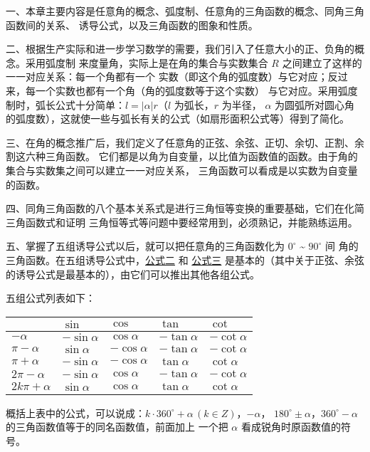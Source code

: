 \xiaojie

一、本章主要内容是任意角的概念、弧度制、任意角的三角函数的概念、同角三角函数间的关系、
诱导公式，以及三角函数的图象和性质。

二、根据生产实际和进一步学习数学的需要，我们引入了任意大小的正、负角的概念。采用弧度制
来度量角，实际上是在角的集合与实数集合 $R$ 之间建立了这样的一一对应关系：每一个角都有一个
实数（即这个角的弧度数）与它对应；反过来，每一个实数也都有一个角（角的弧度数等于这个实数）
与它对应。采用弧度制时，弧长公式十分简单：$l = |\alpha| r$（$l$ 为弧长，$r$ 为半径，
$\alpha$ 为圆弧所对圆心角的弧度数），这就使一些与弧长有关的公式（如扇形面积公式等）得到了简化。

三、在角的概念推广后，我们定义了任意角的正弦、余弦、正切、余切、正割、余割这六种三角函数。
它们都是以角为自变量，以比值为函数值的函数。由于角的集合与实数集之间可以建立一一对应关系，
三角函数可以看成是以实数为自变量的函数。

四、同角三角函数的八个基本关系式是进行三角恒等变换的重要基础，它们在化简三角函数式和证明
三角恒等式等问题中要经常用到，必须熟记，并能熟练运用。

五、掌握了五组诱导公式以后，就可以把任意角的三角函数化为 $0^\circ$ \~{} $90^\circ$ 间
角的三角函数。在五组诱导公式中，\hyperref[gongshi:2]{公式二} 和 \hyperref[gongshi:3]{公式三}
是基本的（其中关于正弦、余弦的诱导公式是最基本的），由它们可以推出其他各组公式。

五组公式列表如下：

\begin{table}[H]
\begin{tabular}{|w{c}{5em}|*{4}{w{c}{4em}|}}
    \hline
     & $\sin$ & $\cos$ & $\tan$ & $\cot$ \\ \hline
    $-\alpha$ & $-\sin\alpha$ & $\cos\alpha$ & $-\tan\alpha$ & $-\cot\alpha$ \\ \hline
    $\pi - \alpha$ & $\sin\alpha$ & $-\cos\alpha$ & $-\tan\alpha$ & $-\cot\alpha$ \\ \hline
    $\pi + \alpha$ & $-\sin\alpha$ & $-\cos\alpha$ & $\tan\alpha$ & $\cot\alpha$ \\ \hline
    $2\pi -\alpha$ & $-\sin\alpha$ & $\cos\alpha$ & $-\tan\alpha$ & $-\cot\alpha$ \\ \hline
    $2k\pi +\alpha$ & $\sin\alpha$ & $\cos\alpha$ & $\tan\alpha$ & $\cot\alpha$ \\ \hline
\end{tabular}
\end{table}

概括上表中的公式，可以说成：$k \cdot 360^\circ + \alpha \, (k \in Z)$，$-\alpha$，
$180^\circ \pm \alpha$，$360^\circ - \alpha$ 的三角函数值等于的同名函数值，前面加上
一个把 $\alpha$ 看成锐角时原函数值的符号。


